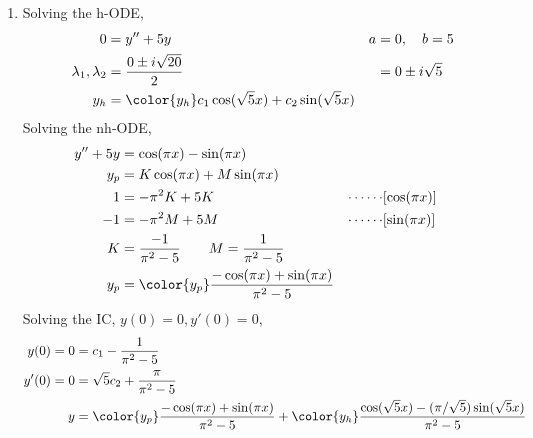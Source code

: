 \begin{enumerate}
    \item Solving the h-ODE,
          \begin{align}
              0                        & = y'' + 5y                                                & a & = 0, \quad b = 5  \\
              \lambda_{1}, \lambda_{2} & = \frac{0 \pm i\sqrt{20}}{2}                              &   & = 0 \pm i\sqrt{5} \\
              y_{h}                    & = \color{y_h} c_{1}\cos(\sqrt{5}x) + c_{2}\sin(\sqrt{5}x)
          \end{align}
          Solving the nh-ODE,
          \begin{align}
              y'' + 5y & = \cos(\pi x) - \sin(\pi x)                                                                 \\
              y_{p}    & = K\cos(\pi x) + M\sin(\pi x)                                                               \\
              1        & = -\pi^{2}K + 5K                                             & \cdots\cdots & [\cos(\pi x)] \\
              -1       & = -\pi^{2}M + 5M                                             & \cdots\cdots & [\sin(\pi x)] \\
              K        & = \frac{-1}{\pi^{2} - 5} \qquad M = \frac{1}{\pi^{2} - 5}                                   \\
              y_{p}    & = \color{y_p} \frac{-\cos(\pi x) + \sin(\pi x)}{\pi^{2} - 5}
          \end{align}
          Solving the IC, $ y(0) = 0, y'(0) = 0 $,
          \begin{align}
              y(0) = 0  & = c_{1} - \frac{1}{\pi^{2} - 5}                                 \\
              y'(0) = 0 & = \sqrt{5}c_{2} + \frac{\pi}{\pi^{2} - 5}                       \\
              y         & = {\color{y_p} \frac{-\cos(\pi x) + \sin(\pi x)}{\pi^{2} - 5} }
              + {\color{y_h} \frac{\cos(\sqrt{5}x) - (\pi/\sqrt{5})\sin(\sqrt{5}x) }{\pi^{2} - 5}}
          \end{align}


\end{enumerate}
